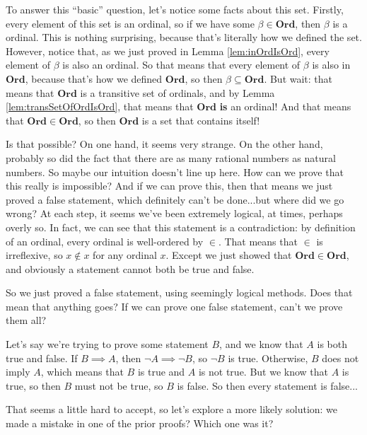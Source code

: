 To answer this ``basic'' question, let's notice some facts about this set.
Firstly, every element of this set is an ordinal, so if we have some $\beta \in \bm{Ord}$, then $\beta$ is a ordinal.
This is nothing surprising, because that's literally how we defined the set.
However, notice that, as we just proved in Lemma \ref{lem:inOrdIsOrd}, every element of $\beta$ is also an ordinal.
So that means that every element of $\beta$ is also in $\bm{Ord}$, because that's how we defined $\bm{Ord}$, so then $\beta \subseteq \bm{Ord}$.
But wait: that means that $\bm{Ord}$ is a transitive set of ordinals, and by Lemma \ref{lem:transSetOfOrdIsOrd}, that means that $\bm{Ord}$ \textbf{is} an ordinal!
And that means that $\bm{Ord} \in \bm{Ord}$, so then $\bm{Ord}$ is a set that contains itself!

Is that possible?
On one hand, it seems very strange.
On the other hand, probably so did the fact that there are as many rational numbers as natural numbers.
So maybe our intuition doesn't line up here.
How can we prove that this really is impossible?
And if we can prove this, then that means we just proved a false statement, which definitely can't be done...but where did we go wrong?
At each step, it seems we've been extremely logical, at times, perhaps overly so.
In fact, we can see that this statement is a contradiction: by definition of an ordinal, every ordinal is well-ordered by $\in$.
That means that $\in$ is irreflexive, so $x \not\in x$ for any ordinal $x$.
Except we just showed that $\bm{Ord} \in \bm{Ord}$, and obviously a statement cannot both be true and false. 

So we just proved a false statement, using seemingly logical methods.
Does that mean that anything goes?
If we can prove one false statement, can't we prove them all? 

Let's say we're trying to prove some statement $B$, and we know that $A$ is both true and false.
If $B \implies A$, then $\neg A \implies \neg B$, so $\neg B$ is true.
Otherwise, $B$ does not imply $A$, which means that $B$ is true and $A$ is not true.
But we know that $A$ is true, so then $B$ must not be true, so $B$ is false.
So then every statement is false... 

That seems a little hard to accept, so let's explore a more likely solution: we made a mistake in one of the prior proofs?
Which one was it?

